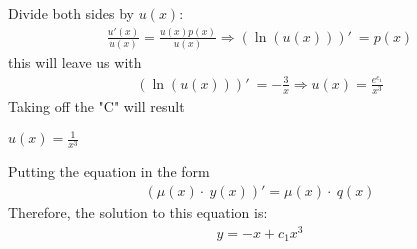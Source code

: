 \begin{enumerate}
  Divide both sides by $u(x)$: 
  \begin{align}
  \frac{u'\left(x\right)}{u\left(x\right)}=\frac{u\left(x\right)p\left(x\right)}{u\left(x\right)}
  \Rightarrow \left(\ln \left(u\left(x\right)\right)\right)'\:=p\left(x\right)
  \end{align}
  this will leave us with
  \begin{align}
      \left(\ln \left(u\left(x\right)\right)\right)'\:=-\frac{3}{x}
      \Rightarrow u\left(x\right)=\frac{e^{c_1}}{x^3}
  \end{align}
  Taking off the "C" will result 
  \begin{raggedleft}
      \qquad $u\left(x\right)=\frac{1}{x^3}$
  \end{raggedleft}
  \newline
  \break
  Putting the equation  in the form 
  \begin{align}
      \left(\mu \left(x\right)\cdot \:y\left(x\right)\right)'=\mu \left(x\right)\cdot \:q\left(x\right)
  \end{align}
  Therefore, the solution to this equation is: 
  \begin{align}
      y=-x+c_1x^3
  \end{align}
  
    \newpage
\end{enumerate}


